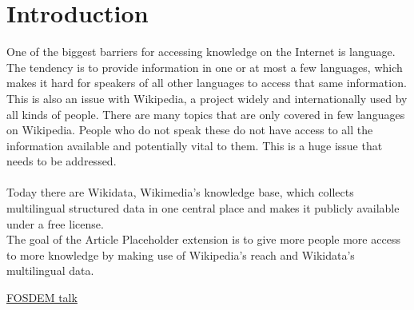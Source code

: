 \section{Introduction}
One of the biggest barriers for accessing knowledge on the Internet is language. The tendency is to provide information in one or at most a few languages, which makes it hard for speakers of all other languages to access that same information. This is also an issue with Wikipedia, a project  widely and internationally used by all kinds of people. There are many topics that are only covered in few languages on Wikipedia. People who do not speak these do not have access to all the information available and potentially vital to them. This is a huge issue that needs to be addressed. \\
\\
Today there are Wikidata, Wikimedia’s knowledge base, which collects multilingual structured data in one central place and makes it publicly available under a free license. \\
The goal of the Article Placeholder extension  is to give more people more access to more knowledge by making use of Wikipedia’s reach and Wikidata’s multilingual data.


\href{https://www.fosdem.org/2016/schedule/event/increasing_access_to_free_and_open_knowledge_for_speakers_of_underserved_languages_on_wikipedia/}{FOSDEM talk}